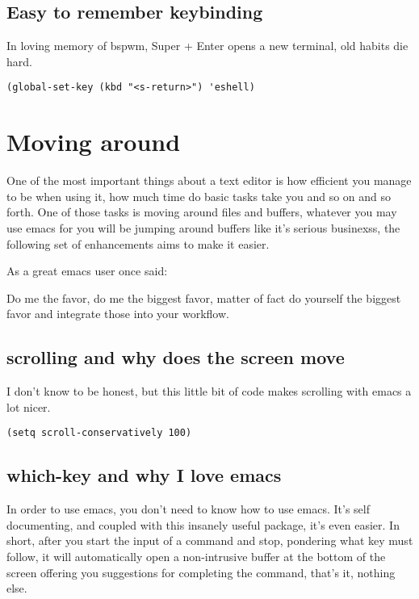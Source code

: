 \documentclass[12pt]{article}
\begin{document}
\subsection{Easy to remember keybinding}
\label{sec:org14fe832}

In loving memory of bspwm, Super + Enter opens a new terminal, old habits die hard.
\begin{verbatim}
(global-set-key (kbd "<s-return>") 'eshell)
\end{verbatim}

\section{Moving around}
\label{sec:orge861b71}

One of the most important things about a text editor is how efficient
you manage to be when using it, how much time do basic tasks take you
and so on and so forth. One of those tasks is moving around files and
buffers, whatever you may use emacs for you will be jumping around
buffers like it’s serious businexss, the following set of enhancements
aims to make it easier.

As a great emacs user once said:

Do me the favor, do me the biggest favor, matter of fact do
yourself the biggest favor and integrate those into your workflow.


\subsection{scrolling and why does the screen move}
\label{sec:org7db6e7e}

I don’t know to be honest, but this little bit of code makes scrolling with emacs a lot nicer.
\begin{verbatim}
(setq scroll-conservatively 100)
\end{verbatim}

\subsection{which-key and why I love emacs}
\label{sec:org289f323}

In order to use emacs, you don’t need to know how to use emacs. It’s self documenting, and coupled with this insanely useful package, it’s even easier. In short, after you start the input of a command and stop, pondering what key must follow, it will automatically open a non-intrusive buffer at the bottom of the screen offering you suggestions for completing the command, that’s it, nothing else.
\end{document}
